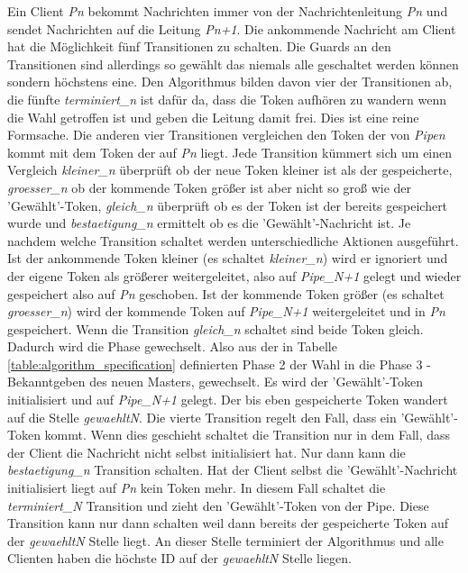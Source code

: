 Ein Client \textit{P{n}} bekommt Nachrichten immer von der Nachrichtenleitung \textit{Pn} und sendet Nachrichten auf die Leitung \textit{Pn+1}. Die ankommende Nachricht am Client hat die Möglichkeit fünf Transitionen zu schalten. Die Guards an den Transitionen sind allerdings so gewählt das niemals alle geschaltet werden können sondern höchstens eine. Den Algorithmus bilden davon vier der Transitionen ab, die fünfte \textit{terminiert\_n} ist dafür da, dass die Token aufhören zu wandern wenn die Wahl getroffen ist und geben die Leitung damit frei. Dies ist eine reine Formsache. Die anderen vier Transitionen vergleichen den Token der von \textit{Pipen} kommt mit dem Token der auf \textit{Pn} liegt. Jede Transition kümmert sich um einen Vergleich \textit{kleiner\_n} überprüft ob der neue Token kleiner ist als der gespeicherte, \textit{groesser\_n} ob der kommende Token größer ist aber nicht so groß wie der 'Gewählt'-Token, \textit{gleich\_n} überprüft ob es der Token ist der bereits gespeichert wurde und \textit{bestaetigung\_n} ermittelt ob es die 'Gewählt'-Nachricht ist. Je nachdem welche Transition schaltet werden unterschiedliche Aktionen ausgeführt. Ist der ankommende Token kleiner (es schaltet \textit{kleiner\_n}) wird er ignoriert und der eigene Token als größerer weitergeleitet, also auf \textit{Pipe\_N+1} gelegt und wieder gespeichert also auf \textit{Pn} geschoben. Ist der kommende Token größer (es schaltet \textit{groesser\_n}) wird der kommende Token auf \textit{Pipe\_N+1} weitergeleitet und in \textit{Pn} gespeichert. Wenn die Transition \textit{gleich\_n} schaltet sind beide Token gleich. Dadurch wird die Phase gewechselt. Also aus der in Tabelle \ref{table:algorithm_specification} definierten Phase 2 der Wahl in die Phase 3 - Bekanntgeben des neuen Masters, gewechselt. Es wird der 'Gewählt'-Token initialisiert und auf \textit{Pipe\_N+1} gelegt. Der bis eben gespeicherte Token wandert auf die Stelle \textit{gewaehltN}. Die vierte Transition regelt den Fall, dass ein 'Gewählt'-Token kommt. Wenn dies geschieht schaltet die Transition nur in dem Fall, dass der Client die Nachricht nicht selbst initialisiert hat. Nur dann kann die \textit{bestaetigung\_n} Transition schalten. Hat der Client selbst die 'Gewählt'-Nachricht initialisiert liegt auf \textit{Pn} kein Token mehr. In diesem Fall schaltet die \textit{terminiert\_N} Transition und zieht den 'Gewählt'-Token von der Pipe. Diese Transition kann nur dann schalten weil dann bereits der gespeicherte Token auf der \textit{gewaehltN} Stelle liegt.
An dieser Stelle terminiert der Algorithmus und alle Clienten haben die höchste ID auf der \textit{gewaehltN} Stelle liegen.

